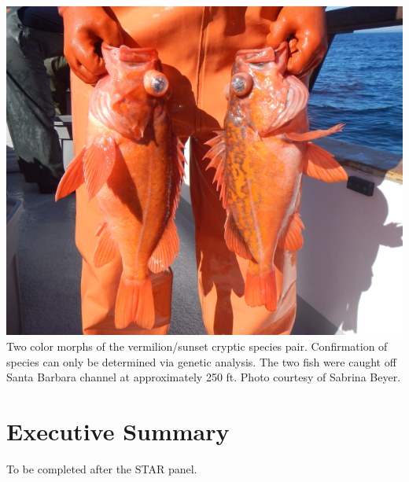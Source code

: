 \documentclass[11pt,
  english,
  a4paper,
]{article}
\begin{document}
\newcommand{\lt}{\ensuremath <}
\newcommand{\gt}{\ensuremath >}

\newcommand\CapeM{$40^\circ 10^\prime N$}
\newcommand\PtC{$34^\circ 27^\prime N$}
\newcommand\CAOR{$42^\circ 00^\prime N$}

\includegraphics{cover_photo.png} Two color morphs of the vermilion/sunset cryptic species pair. Confirmation of species can only be determined via genetic analysis. The two fish were caught off Santa Barbara channel at approximately 250 ft. Photo courtesy of Sabrina Beyer.

\pagebreak
{}
\setcounter{page}{1}

\renewcommand{\thetable}{\roman{table}}
\renewcommand{\thefigure}{\roman{figure}}

\setlength\parskip{0.5em plus 0.1em minus 0.2em}

\printnoidxglossary[sort=word]

\newpage


\hypertarget{executive-summary}{%
\section*{Executive Summary}\label{executive-summary}}

\leavevmode\tagmcend\tagstructend

To be completed after the STAR panel.
\end{document}
